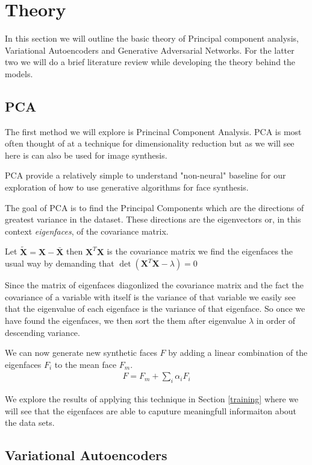 \newpage
\section{Theory} \label{theory}
In this section we will outline the basic theory of Principal component analysis, Variational Autoencoders and Generative Adversarial Networks. For the latter two we will do a brief literature review while developing the theory behind the models.

\subsection{PCA}
The first method we will explore is Princinal Component Analysis. PCA is most often thought of at a technique for dimensionality reduction but as we will see here is can also be used for image synthesis.

PCA provide a relatively simple to understand "non-neural" baseline for our exploration of how to use  generative algorithms for face synthesis.

The goal of PCA is to find the Principal Components which are the directions of greatest variance in the dataset. These directions are the eigenvectors or, in this context \emph{eigenfaces}, of the covariance matrix.

Let $\tilde{\mathbf{X}} = \mathbf{X} - \bar{\mathbf{X}}$ then $\mathbf{X}^T\mathbf{X}$ is the covariance matrix we find the eigenfaces the usual way by demanding that $\det(\mathbf{X}^T\mathbf{X} - \lambda) = 0$

Since the matrix of eigenfaces diagonlized the covariance matrix and the fact the covariance of a variable with itself is the variance of that variable we easily see that the eigenvalue of each eigenface is the variance of that eigenface. So once we have found the eigenfaces, we then sort the them after eigenvalue $\lambda$ in order of descending variance.

We can now generate new synthetic faces $F$ by adding a linear combination of the eigenfaces $F_i$ to the mean face $F_m$.
\begin{align}
F  = F_m + \sum_{i} \alpha_i F_i
\label{eigenface-interpolate}
\end{align}

We explore the results of applying this technique in Section \ref{training} where we will see that the eigenfaces are able to caputure meaningfull informaiton about the data sets.

\subsection{Variational Autoencoders}


